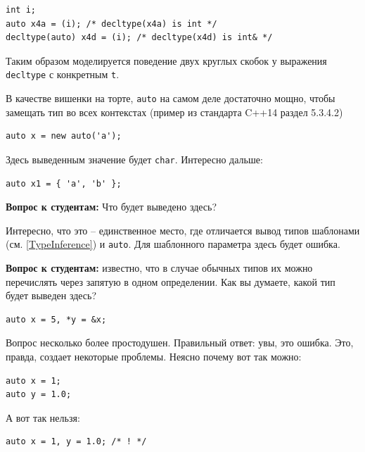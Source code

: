 \documentclass[a4paper,12pt,oneside]{book}
\newif\ifanswers
\begin{document}
\begin{lstlisting}
int i;
auto x4a = (i); /* decltype(x4a) is int */
decltype(auto) x4d = (i); /* decltype(x4d) is int& */
\end{lstlisting}

Таким образом моделируется поведение двух круглых скобок у выражения \lstinline!decltype! с конкретным \lstinline!t!.

В качестве вишенки на торте, \lstinline!auto! на самом деле достаточно мощно, чтобы замещать тип во всех контекстах (пример из стандарта C++14 раздел 5.3.4.2)

\begin{lstlisting}
auto x = new auto('a');
\end{lstlisting}

Здесь выведенным значение будет \lstinline!char!. Интересно дальше:

\begin{lstlisting}
auto x1 = { 'a', 'b' };
\end{lstlisting}

\textbf{Вопрос к студентам:} Что будет выведено здесь? 

\ifanswers
Это довольно хитрый вопрос. Ответ ``массив'' неверный. В реальности будет выведен \lstinline!std::initializer_list<char>! -- тот самый новый тип, который позволил так лихо инициализировать вектор в самом начале.
\fi

Интересно, что это -- единственное место, где отличается вывод типов шаблонами (см. \ref{TypeInference}) и \lstinline!auto!. Для шаблонного параметра здесь будет ошибка.

\textbf{Вопрос к студентам:} известно, что в случае обычных типов их можно перечислять через запятую в одном определении. Как вы думаете, какой тип будет выведен здесь?

\begin{lstlisting}
auto x = 5, *y = &x;
\end{lstlisting}

\ifanswers
Вопрос несколько более простодушен. Правильный ответ: увы, это ошибка. Это, правда, создает некоторые проблемы. Неясно почему вот так можно:

\begin{lstlisting}
auto x = 1; 
auto y = 1.0;
\end{lstlisting}

А вот так нельзя:

\begin{lstlisting}
auto x = 1, y = 1.0; /* ! */
\end{lstlisting}
\end{document}
